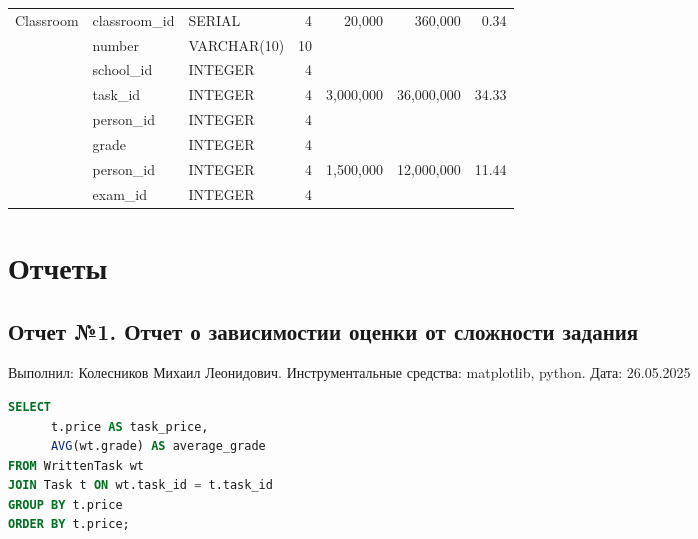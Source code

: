 \documentclass[a4paper]{article}
\begin{document}
{\begin{longtable}{l p{2cm} p{2cm} r r r r}
            \multirow{3}{*}{Classroom}
                              & classroom\_id        & SERIAL               & 4                     & \multirow{3}{*}{20,000}    & \multirow{3}{*}{360,000}      & \multirow{3}{*}{0.34}    \\
                              & number               & VARCHAR(10)          & 10                    &                            &                               &                          \\
                              & school\_id           & INTEGER              & 4                     &                            &                               &                          \\ \addlinespace
            \hline

            \multirow{3}{*}{WrittenTask}
                              & task\_id             & INTEGER              & 4                     & \multirow{3}{*}{3,000,000} & \multirow{3}{*}{36,000,000}   & \multirow{3}{*}{34.33}   \\
                              & person\_id           & INTEGER              & 4                     &                            &                               &                          \\
                              & grade                & INTEGER              & 4                     &                            &                               &                          \\ \addlinespace
            \hline

            \multirow{2}{*}{PersonExam}
                              & person\_id           & INTEGER              & 4                     & \multirow{2}{*}{1,500,000} & \multirow{2}{*}{12,000,000}   & \multirow{2}{*}{11.44}   \\
                              & exam\_id             & INTEGER              & 4                     &                            &                               &                          \\
      \end{longtable}
}
\newpage
\section{Отчеты}
\subsection{Отчет №1. Отчет о зависимостии оценки от сложности задания}
Выполнил: Колесников Михаил Леонидович.
Инструментальные средства: matplotlib, python.
Дата: 26.05.2025
\begin{lstlisting}[language=SQL, frame=none, numbers=none, caption={1. Точечная диаграмма: зависимость оценки от сложности задания}]
SELECT 
      t.price AS task_price,
      AVG(wt.grade) AS average_grade
FROM WrittenTask wt
JOIN Task t ON wt.task_id = t.task_id
GROUP BY t.price
ORDER BY t.price;
            \end{lstlisting}
\end{document}
